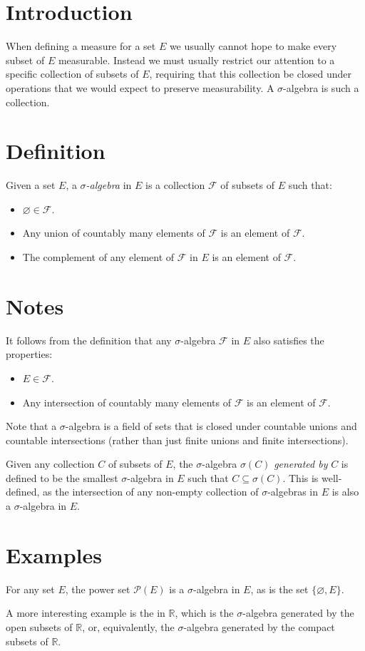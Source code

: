 \documentclass{article}
\def\emptyset{\varnothing}
\def\F{\mathcal{F}}
\def\R{\mathbb{R}}
\def\powerset#1{\mathcal{P}(#1)}
\begin{document}

\section*{Introduction}

When defining a measure for a set $E$
we usually cannot hope to make every subset of $E$ measurable.
Instead we must usually restrict our attention
to a specific collection of subsets of $E$,
requiring that this collection be closed under operations
that we would expect to preserve measurability.
A $\sigma$-algebra is such a collection.

\section*{Definition}

Given a set $E$, a \emph{$\sigma$-algebra} in $E$
is a collection $\F$ of subsets of $E$ such that:
\begin{itemize}
\item $\emptyset\in\F$.
\item Any union of countably many elements of $\F$
      is an element of $\F$.
\item The complement of any element of $\F$ in $E$
      is an element of $\F$.
\end{itemize}

\section*{Notes}

It follows from the definition that any $\sigma$-algebra $\F$ in $E$
also satisfies the properties:
\begin{itemize}
\item $E\in\F$.
\item Any intersection of countably many elements of $\F$
      is an element of $\F$.
\end{itemize}

Note that a $\sigma$-algebra is a field of sets
that is closed under countable unions and countable intersections
(rather than just finite unions and finite intersections).

Given any collection $C$ of subsets of $E$,
the $\sigma$-algebra $\sigma(C)$ \emph{generated by} $C$
is defined to be the smallest $\sigma$-algebra in $E$
such that $C\subseteq \sigma(C)$.
This is well-defined,
as the intersection of any non-empty collection of $\sigma$-algebras in $E$
is also a $\sigma$-algebra in $E$.

\section*{Examples}

For any set $E$, 
the power set $\powerset{E}$ is a $\sigma$-algebra in $E$,
as is the set $\{\emptyset,E\}$.

A more interesting example is the 
 in $\R$,
which is the $\sigma$-algebra generated by the open subsets of $\R$,
or, equivalently,
the $\sigma$-algebra generated by the compact subsets of $\R$.
\end{document}
